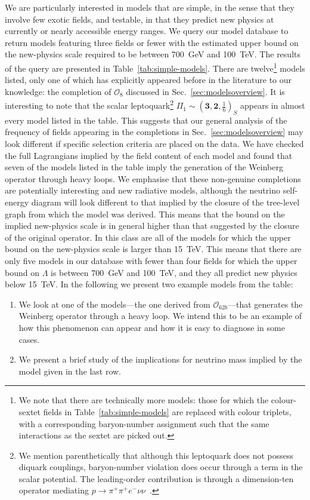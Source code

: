 We are particularly interested in models that are simple, in the sense that they
involve few exotic fields, and testable, in that they predict new physics at
currently or nearly accessible energy ranges. We query our model database to
return models featuring three fields or fewer with the estimated upper bound on
the new-physics scale required to be between \SI{700}{\GeV} and \SI{100}{\TeV}.
The results of the query are presented in Table~\ref{tab:simple-models}. There
are twelve\footnote{We note that there are technically more models: those for
  which the colour-sextet fields in Table~\ref{tab:simple-models} are replaced
  with colour triplets, with a corresponding baryon-number assignment such that
  the same interactions as the sextet are picked out.} models listed, only one
of which has explicitly appeared before in the literature to our knowledge: the
completion of $\mathcal{O}_{8}$ discussed in Sec.~\ref{sec:modelsoverview}. It
is interesting to note that the scalar leptoquark\footnote{We mention
  parenthetically that although this leptoquark does not possess diquark
  couplings, baryon-number violation does occur through a term in the scalar
  potential. The leading-order contribution is through a dimension-ten operator
  mediating $p \to \pi^{+}\pi^{+} e^{-} \nu \nu$~\cite{Arnold:2012sd}.}
$\Pi_{1} \sim (\mathbf{3}, \mathbf{2}, \tfrac{1}{6})_{S}$ appears in almost
every model listed in the table. This suggests that our general analysis of the
frequency of fields appearing in the completions in
Sec.~\ref{sec:modelsoverview} may look different if specific selection criteria
are placed on the data. We have checked the full Lagrangians implied by the
field content of each model and found that seven of the models listed in the
table imply the generation of the Weinberg operator through heavy loops. We
emphasise that these non-genuine completions are potentially interesting and new
radiative models, although the neutrino self-energy diagram will look different
to that implied by the closure of the tree-level graph from which the model was
derived. This means that the bound on the implied new-physics scale is in
general higher than that suggested by the closure of the original operator. In
this class are all of the models for which the upper bound on the new-physics
scale is larger than \SI{15}{\TeV}. This means that there are only five models
in our database with fewer than four fields for which the upper bound on
$\Lambda$ is between \SI{700}{\GeV} and \SI{100}{\TeV}, and they all predict new
physics below \SI{15}{\TeV}. In the following we present two example models from
the table:
\begin{enumerate}
  \item We look at one of the models---the one derived from
    $\mathcal{O}_{62b}$---that generates the Weinberg operator through a heavy
    loop. We intend this to be an example of how this phenomenon can appear and
    how it is easy to diagnose in some cases.
  \item We present a brief study of the implications for neutrino mass implied
    by the model given in the last row.
\end{enumerate}

